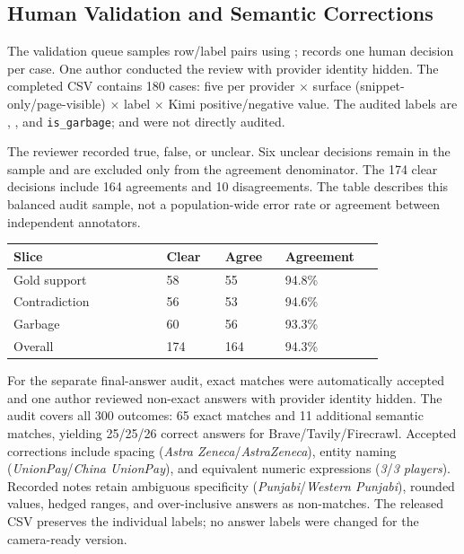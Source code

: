 \subsection{Human Validation and Semantic Corrections}
\label{app:examples}
The validation queue samples row/label pairs using ;  records one human decision per case. One author conducted the review with provider identity hidden. The completed CSV contains 180 cases: five per provider $\times$ surface (snippet-only/page-visible) $\times$ label $\times$ Kimi positive/negative value. The audited labels are \containsGold{}, \contraGold{}, and \texttt{is\_garbage}; \goldSnip{} and \goldPage{} were not directly audited.

The reviewer recorded true, false, or unclear. Six unclear decisions remain in the sample and are excluded only from the agreement denominator. The 174 clear decisions include 164 agreements and 10 disagreements. The table describes this balanced audit sample, not a population-wide error rate or agreement between independent annotators.

\begin{center}
\footnotesize
\begin{tabularx}{\linewidth}{@{}L{0.34\linewidth}R{0.13\linewidth}R{0.13\linewidth}R{0.22\linewidth}@{}}
\toprule
\textbf{Slice} & \textbf{Clear} & \textbf{Agree} & \textbf{Agreement} \\
\midrule
Gold support & 58 & 55 & 94.8\% \\
Contradiction & 56 & 53 & 94.6\% \\
Garbage & 60 & 56 & 93.3\% \\
Overall & 174 & 164 & 94.3\% \\
\bottomrule
\end{tabularx}
\end{center}

For the separate final-answer audit, exact matches were automatically accepted and one author reviewed non-exact answers with provider identity hidden. The audit covers all 300 outcomes: 65 exact matches and 11 additional semantic matches, yielding 25/25/26 correct answers for Brave/Tavily/Firecrawl. Accepted corrections include spacing (\emph{Astra Zeneca}/\emph{AstraZeneca}), entity naming (\emph{UnionPay}/\emph{China UnionPay}), and equivalent numeric expressions (\emph{3}/\emph{3 players}). Recorded notes retain ambiguous specificity (\emph{Punjabi}/\emph{Western Punjabi}), rounded values, hedged ranges, and over-inclusive answers as non-matches. The released CSV preserves the individual labels; no answer labels were changed for the camera-ready version.

